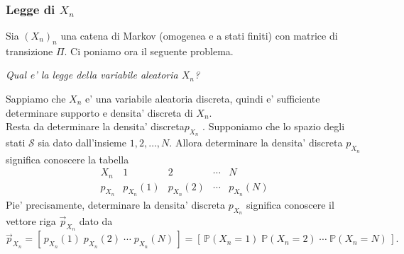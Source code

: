 \documentclass[a4paper,12pt]{article}
\begin{document}
\vspace{1px}\\
\\
\vspace{1px}\\
\subsubsection{Legge di $X_n$}
Sia $(X_n)_n$ una catena di Markov (omogenea e a stati finiti) con matrice di transizione $\Pi$. Ci poniamo ora il seguente problema.
\begin{center}
  \textit{Qual e' la legge della variabile aleatoria $X_n$?}
\end{center}
Sappiamo che $X_n$ e' una variabile aleatoria discreta, quindi e' sufficiente determinare supporto e densita' discreta di $X_n$.\\
Resta da determinare la densita' discreta$p_{X_n}$ . Supponiamo che lo spazio degli stati $\mathcal{S}$ sia dato dall’insieme ${1, 2, \dots , N }$. Allora determinare la densita' discreta $p_{X_n}$ significa conoscere la tabella
\[
\begin{array}{c|cccc}
X_n      & 1 & 2 & \cdots & N \\
\hline
p_{X_n}  & p_{X_n}(1) & p_{X_n}(2) & \cdots & p_{X_n}(N)
\end{array}
\]
Pie' precisamente, determinare la densita' discreta $p_{X_n}$ significa conoscere il vettore riga $\vec{p}_{X_n}$ dato da
\[
\vec{p}_{X_n}
= [\,p_{X_n}(1)\; p_{X_n}(2)\; \cdots\; p_{X_n}(N)\,]
= [\,\mathbb{P}(X_n = 1)\; \mathbb{P}(X_n = 2)\; \cdots\; \mathbb{P}(X_n = N)\,].
\]
\\
\vspace{1px}\\
\end{document}
